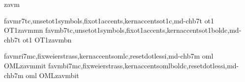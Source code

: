 \reglyphfonts
   
\endreglyphfonts
\reglyphfonts
  
  \def\thenewskewchar{dieresis}
\endreglyphfonts

\reglyphfonts
  
\endreglyphfonts
\reglyphfonts
  
  \def\thenewskewchar{uni0361} %
\endreglyphfonts

\reglyphfonts
  
\endreglyphfonts
\reglyphfonts
  
  \def\thenewskewchar{uni0361}
\endreglyphfonts

\reglyphfonts
  
\endreglyphfonts


\installfonts


  {zavm}{} %




  {favmr7tc,unsetot1symbols,fixot1accents,kernaccentsot1c,md-chb7t}
  {ot1}
  {OT1}{zavm}{m}{n}{}
  {favmb7tc,unsetot1symbols,fixot1accents,kernaccentsot1boldc,md-chb7t}
  {ot1}
  {OT1}{zavm}{b}{n}{}

  {favmri7mc,fixweierstrass,kernaccentsomlc,resetdotlessi,md-chb7m}
  {oml}
  {OML}{zavm}{m}{it}{}
  {favmbi7mc,fixweierstrass,kernaccentsomlboldc,resetdotlessi,md-chb7m}
  {oml}
  {OML}{zavm}{b}{it}{}

